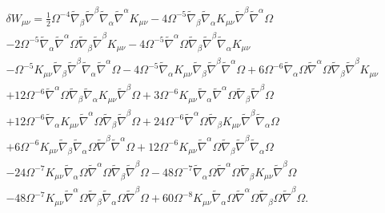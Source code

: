 %
\begin{eqnarray}
&&\delta W_{\mu\nu}=\frac{1}{2}\Omega^{-4}\tilde{\nabla}_{\beta}\tilde{\nabla}^{\beta}\tilde{\nabla}_{\alpha}\tilde{\nabla}^{\alpha}K_{\mu \nu}-  4\Omega^{-5} \tilde{\nabla}_{\beta}\tilde{\nabla}_{\alpha}K_{\mu \nu} \tilde{\nabla}^{\beta}\tilde{\nabla}^{\alpha}\Omega 
\nonumber\\
&&- 2\Omega^{-5}  \tilde{\nabla}_{\alpha}\tilde{\nabla}^{\alpha}\Omega \tilde{\nabla}_{\beta}\tilde{\nabla}^{\beta}K_{\mu \nu}-  4 \Omega^{-5}\tilde{\nabla}^{\alpha}\Omega \tilde{\nabla}_{\beta}\tilde{\nabla}^{\beta}\tilde{\nabla}_{\alpha}K_{\mu \nu}  
\nonumber\\
&&-  \Omega^{-5}K_{\mu \nu} \tilde{\nabla}_{\beta}\tilde{\nabla}^{\beta}\tilde{\nabla}_{\alpha}\tilde{\nabla}^{\alpha}\Omega -  4\Omega^{-5} \tilde{\nabla}_{\alpha}K_{\mu \nu} \tilde{\nabla}_{\beta}\tilde{\nabla}^{\beta}\tilde{\nabla}^{\alpha}\Omega + 6\Omega^{-6} \tilde{\nabla}_{\alpha}\Omega \tilde{\nabla}^{\alpha}\Omega \tilde{\nabla}_{\beta}\tilde{\nabla}^{\beta}K_{\mu \nu}  
\nonumber\\
&&+ 12\Omega^{-6} \tilde{\nabla}^{\alpha}\Omega \tilde{\nabla}_{\beta}\tilde{\nabla}_{\alpha}K_{\mu \nu} \tilde{\nabla}^{\beta}\Omega
+ 3\Omega^{-6} K_{\mu \nu} \tilde{\nabla}_{\alpha}\tilde{\nabla}^{\alpha}\Omega \tilde{\nabla}_{\beta}\tilde{\nabla}^{\beta}\Omega  
\nonumber\\
&&+ 12 \Omega^{-6}\tilde{\nabla}_{\alpha}K_{\mu \nu} \tilde{\nabla}^{\alpha}\Omega \tilde{\nabla}_{\beta}\tilde{\nabla}^{\beta}\Omega 
+ 24\Omega^{-6}  \tilde{\nabla}^{\alpha}\Omega \tilde{\nabla}_{\beta}K_{\mu \nu} \tilde{\nabla}^{\beta}\tilde{\nabla}_{\alpha}\Omega 
\nonumber\\
&&
+ 6\Omega^{-6} K_{\mu \nu} \tilde{\nabla}_{\beta}\tilde{\nabla}_{\alpha}\Omega \tilde{\nabla}^{\beta}\tilde{\nabla}^{\alpha}\Omega 
+ 12\Omega^{-6} K_{\mu \nu} \tilde{\nabla}^{\alpha}\Omega \tilde{\nabla}_{\beta}\tilde{\nabla}^{\beta}\tilde{\nabla}_{\alpha}\Omega  
\nonumber\\
&&-  24 \Omega^{-7}K_{\mu \nu} \tilde{\nabla}_{\alpha}\Omega \tilde{\nabla}^{\alpha}\Omega \tilde{\nabla}_{\beta}\tilde{\nabla}^{\beta}\Omega 
-  48\Omega^{-7}  \tilde{\nabla}_{\alpha}\Omega \tilde{\nabla}^{\alpha}\Omega \tilde{\nabla}_{\beta}K_{\mu \nu} \tilde{\nabla}^{\beta}\Omega 
\nonumber\\
&&
-  48\Omega^{-7}  K_{\mu \nu} \tilde{\nabla}^{\alpha}\Omega \tilde{\nabla}_{\beta}\tilde{\nabla}_{\alpha}\Omega \tilde{\nabla}^{\beta}\Omega 
+ 60\Omega^{-8} K_{\mu \nu} \tilde{\nabla}_{\alpha}\Omega \tilde{\nabla}^{\alpha}\Omega \tilde{\nabla}_{\beta}\Omega \tilde{\nabla}^{\beta}\Omega.
\label{AP57}
\end{eqnarray}
